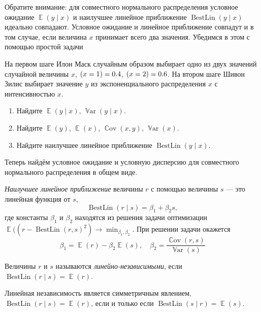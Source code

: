 \documentclass[12pt]{article}
\DeclareMathOperator{\Cov}{\mathbb{C}ov}
\DeclareMathOperator{\Var}{\mathbb{V}ar}
\DeclareMathOperator{\BestLin}{BestLin}
\let\P\relax
\DeclareMathOperator{\P}{\mathbb{P}}
\DeclareMathOperator{\E}{\mathbb{E}}
\begin{document}
Обратите внимание: для совместного нормального распределения условное ожидание $\E(y \mid x)$ и наилучшее линейное приближение $\BestLin(y \mid x)$ идеально совпадают. 
Условное ожидание и линейное приближение совпадут и в том случае, если величина $x$ принимает всего два значения.
Убедимся в этом с помощью простой задачи

\begin{problem}
    На первом шаге Илон Маск случайным образом выбирает одно из двух значений случайной величины $x$, $\P(x = 1) = 0.4$, $\P(x = 2) = 0.6$.
    На втором шаге Шивон Зилис выбирает значение $y$ из экспоненциального распределения $x$ с интенсивностью $x$.

\begin{enumerate}
    \item Найдите $\E(y \mid x)$, $\Var(y \mid x)$.
    \item Найдите $\E(y)$, $\E(x)$, $\Cov(x, y)$, $\Var(x)$.
    \item Найдите наилучшее линейное приближение $\BestLin(y \mid x)$.
\end{enumerate}

    \begin{sol}
    \end{sol}
\end{problem}


Теперь найдём условное ожидание и условную дисперсию для совместного нормального распределения в общем виде. 



\begin{definition}
\emph{Наилучшее линейное приближение} величины $r$ с помощью величины $s$ — это линейная функция от $s$,
\[
\BestLin(r \mid s) = \beta_1 + \beta_2 s,
\]
где константы $\beta_1$ и $\beta_2$ находятся из решения задачи оптимизации
$\E((r - \BestLin(r, s)^2) \to \min_{\beta_1, \beta_2}$.
При решении задачи окажется
\[
\beta_1 = \E(r) - \beta_2 \E(s), \quad \beta_2 = \frac{\Cov(r, s)}{\Var(s)}
\]
\end{definition}

\begin{definition}
Величины $r$ и $s$ называются \emph{линейно-независимыми}, если $\BestLin(r \mid s) = \E(r)$.
\end{definition}

Линейная независимость является симметричным явлением, $\BestLin(r \mid s) = \E(r)$, 
если и только если $\BestLin(s \mid r) = \E(s)$.
\end{document}
